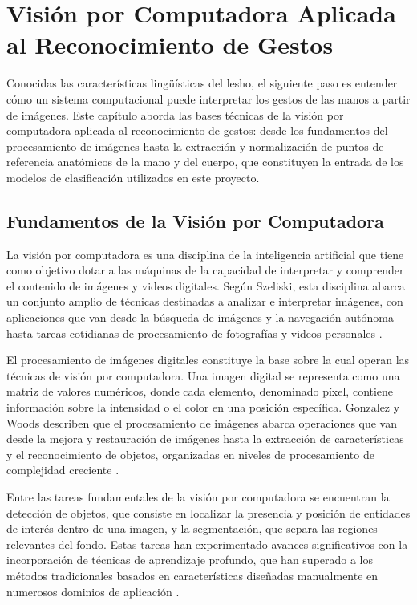 \chapter{Visión por Computadora Aplicada al Reconocimiento de Gestos}
\label{cp:vision-computadora}

\insertminitoc
\parindent0pt

Conocidas las características lingüísticas del \acrshort{lesho}, el siguiente paso es entender cómo
un sistema computacional puede interpretar los gestos de las manos a partir de imágenes.
Este capítulo aborda las bases técnicas de la visión por computadora aplicada al
reconocimiento de gestos: desde los fundamentos del procesamiento de imágenes hasta la
extracción y normalización de puntos de referencia anatómicos de la mano y del cuerpo, que
constituyen la entrada de los modelos de clasificación utilizados en este proyecto.

\section{Fundamentos de la Visión por Computadora}

La visión por computadora es una disciplina de la inteligencia artificial que tiene como
objetivo dotar a las máquinas de la capacidad de interpretar y comprender el contenido de
imágenes y videos digitales. Según Szeliski, esta disciplina abarca un conjunto amplio de
técnicas destinadas a analizar e interpretar imágenes, con aplicaciones que van desde la
búsqueda de imágenes y la navegación autónoma hasta tareas cotidianas de procesamiento
de fotografías y videos personales \cite{szeliski_cv_2022}.

El procesamiento de imágenes digitales constituye la base sobre la cual operan las técnicas
de visión por computadora. Una imagen digital se representa como una matriz de valores
numéricos, donde cada elemento, denominado píxel, contiene información sobre la
intensidad o el color en una posición específica. Gonzalez y Woods describen que el
procesamiento de imágenes abarca operaciones que van desde la mejora y restauración de
imágenes hasta la extracción de características y el reconocimiento de objetos, organizadas
en niveles de procesamiento de complejidad creciente \cite{gonzalez_dip_2018}.

Entre las tareas fundamentales de la visión por computadora se encuentran la detección de
objetos, que consiste en localizar la presencia y posición de entidades de interés dentro de
una imagen, y la segmentación, que separa las regiones relevantes del fondo. Estas tareas
han experimentado avances significativos con la incorporación de técnicas de aprendizaje
profundo, que han superado a los métodos tradicionales basados en características diseñadas
manualmente en numerosos dominios de aplicación \cite{szeliski_cv_2022}.


